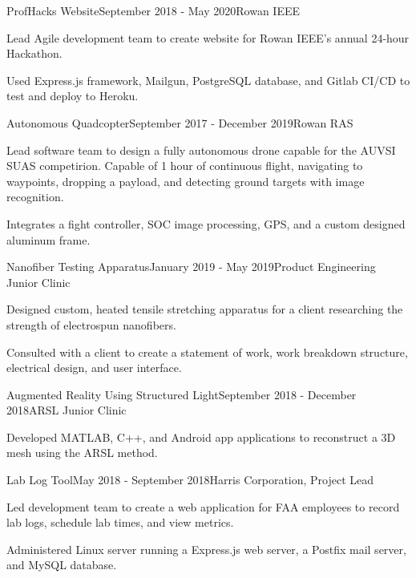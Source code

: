 {  %

  \begin{rSubsection}{ProfHacks Website}{September 2018 - May 2020}{Rowan IEEE}{}
  \item Lead Agile development team to create website for Rowan IEEE's annual 24-hour Hackathon.
  \item Used Express.js framework, Mailgun, PostgreSQL database, and Gitlab CI/CD to test and deploy to Heroku.
  \end{rSubsection}


  \begin{rSubsection}{Autonomous Quadcopter}{September 2017 - December 2019}{Rowan
    RAS}{}
  \item Lead software team to design a fully autonomous drone capable for the AUVSI SUAS competirion. Capable of 1
    hour of continuous flight, navigating to waypoints, dropping a
    payload, and detecting ground targets with image recognition.
  \item Integrates a fight controller, SOC image processing, GPS,
    and a custom designed aluminum frame.
  \end{rSubsection}


  \begin{rSubsection}{Nanofiber Testing Apparatus}{January 2019 - May 2019}{Product Engineering Junior Clinic}{}
  \item Designed custom, heated tensile stretching apparatus for a client researching the strength of electrospun nanofibers.
  \item Consulted with a client to create a statement of work, work breakdown structure, electrical design, and user interface.
  \end{rSubsection}


  \begin{rSubsection}{Augmented Reality Using Structured Light}{September
    2018 - December 2018}{ARSL Junior Clinic}{}
  \item Developed MATLAB, C++, and Android app applications to reconstruct a 3D mesh using the ARSL method.
  \end{rSubsection}


  \begin{rSubsection}{Lab Log Tool}{May 2018 - September 2018}{Harris Corporation, Project Lead}{}
  \item Led development team to create a web application for FAA employees to record lab logs, schedule lab times, and view metrics.
  \item Administered Linux server running a Express.js web server, a Postfix mail server, and MySQL database.
  \end{rSubsection}

  }


